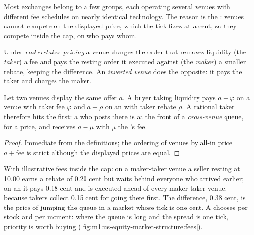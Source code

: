 Most exchanges belong to a few groups, each operating several venues with
different fee schedules on nearly identical technology. The reason is
the : venues cannot compete on the displayed price, which the
tick fixes at a cent, so they compete inside the cap, on who pays whom.

\begin{definition}\label{def:m1:us-equity-market-structure:makertaker}
Under \emph{maker-taker pricing} a venue charges
the order that removes liquidity (the \emph{taker}) a fee and pays the
resting order it executed against (the \emph{maker}) a smaller rebate,
keeping the difference. An \emph{inverted venue} does
the opposite: it pays the taker and charges the maker.
\end{definition}

\begin{proposition}\label{prop:m1:us-equity-market-structure:finer}
Let two venues display the same offer $a$. A buyer taking liquidity pays
$a + \varphi$ on a venue with taker fee $\varphi$ and $a - \rho$ on an
 with taker rebate $\rho$. A rational taker therefore hits the
 first: a  who posts there is at the front of a
\emph{cross-venue} queue, for a price, and receives $a - \mu$ with $\mu$ the
's  fee.
\end{proposition}
\begin{proof}
Immediate from the definitions; the ordering of venues by all-in price
$a + \text{fee}$ is strict although the displayed prices are equal.
\end{proof}

\begin{example}\label{ex:m1:us-equity-market-structure:priority}
With illustrative fees inside the cap: on a maker-taker venue a seller
resting at 10.00 earns a rebate of 0.20 cent but waits behind everyone who
arrived earlier; on an  it pays 0.18 cent and is executed ahead
of every maker-taker venue, because takers collect 0.15 cent for going there
first. The difference, 0.38 cent, is the price of jumping the queue in a
market whose tick is one cent. A  chooses per stock and per
moment: where the queue is long and the spread is one tick, priority is
worth buying (\cref{fig:m1:us-equity-market-structure:fees}).
\end{example}

